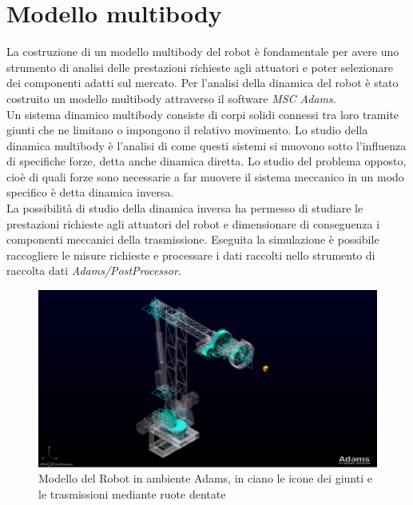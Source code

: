 \documentclass[%
corpo=11pt,
twoside,
 stile=classica,
oldstyle,
greek,%
]{toptesi}
\begin{document}
	\section{Modello multibody}
	La costruzione di un modello multibody del robot è fondamentale per avere uno strumento di analisi delle prestazioni richieste agli attuatori e poter selezionare dei componenti adatti sul mercato. 
	Per l'analisi della dinamica del robot è stato costruito un modello multibody attraverso il software \textit{MSC Adams}. \\
	Un sistema dinamico multibody consiste di corpi solidi connessi tra loro tramite giunti che ne limitano o impongono il relativo movimento. Lo studio della dinamica multibody è l’analisi di come questi sistemi si muovono sotto l’influenza di specifiche forze, detta anche dinamica diretta. Lo studio del problema opposto, cioè di quali forze sono necessarie a far muovere il sistema meccanico in un modo specifico è detta dinamica inversa.\\
	La possibilità di studio della dinamica inversa ha permesso di studiare le prestazioni richieste agli attuatori del robot e dimensionare di conseguenza i componenti meccanici della trasmissione. 
	Eseguita la simulazione è possibile raccogliere le misure richieste e processare i dati raccolti nello strumento di raccolta dati \textit{Adams/PostProcessor}.  
		\begin{figure}
		\centering
		\includegraphics[width=\textwidth]{Screen/Model1.png}
		\caption{Modello del Robot in ambiente Adams, in ciano le icone dei giunti e le trasmissioni mediante ruote dentate}
		\label{fig:adamsmodel}
	\end{figure}
	
\end{document}
